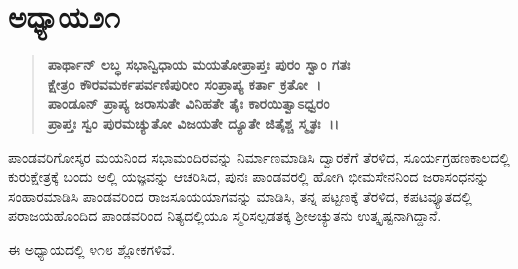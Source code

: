 \section*{ಅಧ್ಯಾಯ\enginline{-}೨೧}

\begin{verse}
\textbf{ಪಾರ್ಥಾನ್ ಲಬ್ಧ ಸಭಾನ್ವಿಧಾಯ ಮಯತೋಪ್ರಾಪ್ತಃ ಪುರಂ ಸ್ವಾಂ ಗತಃ\textbf{\\\textbf{ಕ್ಷೇತ್ರಂ ಕೌರವಮರ್ಕಪರ್ವಣಿಪುರೀಂ ಸಂಪ್ರಾಪ್ಯ ಕರ್ತಾ ಕ್ರತೋ~।} \\\textbf{ಪಾಂಡೂನ್ ಪ್ರಾಪ್ಯ ಜರಾಸುತೇ ವಿನಿಹತೇ ತೈಃ ಕಾರಯಿತ್ವಾಽಧ್ವರಂ }\\\textbf{ಪ್ರಾಪ್ತಃ ಸ್ವಂ ಪುರಮಚ್ಯುತೋ ವಿಜಯತೇ ದ್ಯೂತೇ ಜಿತೈಶ್ಚ ಸ್ಮೃತಃ~।।}}}
\end{verse}

ಪಾಂಡವರಿಗೋಸ್ಕರ ಮಯನಿಂದ ಸಭಾಮಂದಿರವನ್ನು ನಿರ್ಮಾಣಮಾಡಿಸಿ ದ್ವಾರಕೆಗೆ ತೆರಳಿದ, ಸೂರ್ಯಗ್ರಹಣಕಾಲದಲ್ಲಿ ಕುರುಕ್ಷೇತ್ರಕ್ಕೆ ಬಂದು ಅಲ್ಲಿ ಯಜ್ಞವನ್ನು ಆಚರಿಸಿದ, ಪುನಃ ಪಾಂಡವರಲ್ಲಿ ಹೋಗಿ ಭೀಮಸೇನನಿಂದ ಜರಾಸಂಧನನ್ನು ಸಂಹಾರಮಾಡಿಸಿ ಪಾಂಡವ\-ರಿಂದ ರಾಜಸೂಯಯಾಗವನ್ನು ಮಾಡಿಸಿ, ತನ್ನ ಪಟ್ಟಣಕ್ಕೆ ತೆರಳಿದ, ಕಪಟವ್ಯೂತದಲ್ಲಿ ಪರಾಜಯಹೊಂದಿದ ಪಾಂಡವರಿಂದ ನಿತ್ಯದಲ್ಲಿಯೂ ಸ್ಮರಿಸಲ್ಪಡತಕ್ಕ ಶ‍್ರೀಅಚ್ಯುತನು ಉತ್ಕೃಷ್ಟನಾಗಿದ್ದಾನೆ.

ಈ ಅಧ್ಯಾಯದಲ್ಲಿ ೪೧೮ ಶ್ಲೋಕಗಳಿವೆ.

